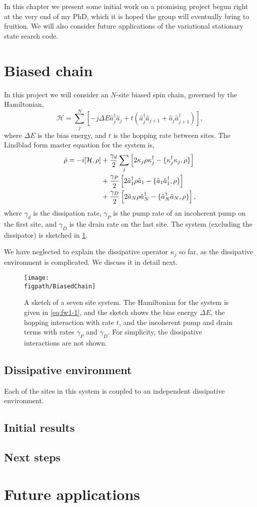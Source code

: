 In this chapter we present some initial work on a promising project begun right at the very end of my PhD, which it is hoped the group will eventually bring to fruition. We will also consider future applications of the variational stationary state search code.

\section{Biased chain}
In this project we will consider an \(N\)-site biased spin chain, governed by the Hamiltonian,
\begin{equation}
	\mathcal{H} = \sum_{j}^{N}\left[ -j \Delta E \hat{a}_{j}^{\dagger}\hat{a}_{j} + t\left( \hat{a}_{j}^{\dagger}\hat{a}_{j+1} + \hat{a}_{j}\hat{a}_{j+1}^{\dagger}\right)\right],
	\label{eq:fw1-1}
\end{equation}
where \(\Delta E\) is the bias energy, and \(t\) is the hopping rate between sites. The Lindblad form master equation for the system is, 
\begin{align}
	\dot{\rho} = -i[\mathcal{H}, \rho] &+ \frac{\gamma_{d}}{2} \sum_{j} \left[2\kappa_{j}\rho\kappa_{j}^{\dagger} - \{\kappa_{j}^{\dagger}\kappa_{j}, \rho\}\right] \notag \\
	&+ \frac{\gamma_{P}}{2}\left[2\hat{a}_{1}^{\dagger}\rho\hat{a}_{1} - \{\hat{a}_{1}\hat{a}_{1}^{\dagger}, \rho\}\right] \notag \\
	&+ \frac{\gamma_{D}}{2}\left[2\hat{a}_{N}\rho\hat{a}_{N}^{\dagger} - \{\hat{a}_{N}^{\dagger}\hat{a}_{N}, \rho\}\right],
	\label{eq:fw1-2}
\end{align}
where \(\gamma_{d}\) is the dissipation rate, \(\gamma_{P}\) is the pump rate of an incoherent pump on the first site, and \(\gamma_{D}\) is the drain rate on the last site. The system (excluding the dissipator) is sketched in \cref{fig:fw1-1}.

We have neglected to explain the dissipative operator \(\kappa_{j}\) so far, as the dissipative environment is complicated. We discuss it in detail next.

\begin{figure}[ht!]
	\centering
	\texttt{[image: \\figpath/BiasedChain]}
	\caption{\label{fig:fw1-1}A sketch of a seven site system. The Hamiltonian for the system is given in \cref{eq:fw1-1}, and the sketch shows the bias energy \(\Delta E\), the hopping interaction with rate \(t\), and the incoherent pump and drain terms with rates \(\gamma_{P}\) and \(\gamma_{D}\). For simplicity, the dissipative interactions are not shown.}
\end{figure}

\subsection{Dissipative environment}
Each of the sites in this system is coupled to an independent dissipative environment. 

\subsection{Initial results}

\subsection{Next steps}

\section{Future applications} 